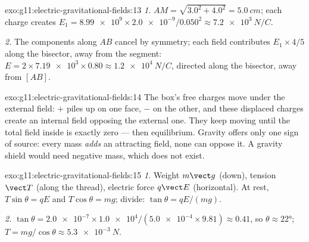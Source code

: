 \begin{solution}{exo:g11:electric-gravitational-fields:13}
\emph{1.} $AM = \sqrt{3.0^2 + 4.0^2} = \qty{5.0}{cm}$; each charge
creates $E_1 = \num{8.99e9} \times \num{2.0e-9} / 0.050^2
\approx \qty{7.2e3}{N/C}$.

\emph{2.} The components along $AB$ cancel by symmetry; each field
contributes $E_1 \times 4/5$ along the bisector, away from the segment:
$E = 2 \times \num{7.19e3} \times 0.80 \approx \qty{1.2e4}{N/C}$,
directed along the bisector, away from $[AB]$.
\end{solution}

\begin{solution}{exo:g11:electric-gravitational-fields:14}
The box's free charges move under the external field: $+$ piles up on
one face, $-$ on the other, and these displaced charges create an
internal field opposing the external one. They keep moving until the
total field inside is exactly zero --- then equilibrium. Gravity offers
only one sign of source: every mass \emph{adds} an attracting field,
none can oppose it. A gravity shield would need negative mass, which
does not exist.
\end{solution}

\begin{solution}{exo:g11:electric-gravitational-fields:15}
\emph{1.} Weight $m\vect g$ (down), tension $\vect T$ (along the
thread), electric force $q\vect E$ (horizontal). At rest,
$T\sin\theta = qE$ and $T\cos\theta = mg$; divide:
$\tan\theta = qE/(mg)$.

\emph{2.} $\tan\theta = \num{2.0e-7} \times \num{1.0e4} /
(\num{5.0e-4} \times 9.81) \approx 0.41$, so $\theta \approx \ang{22}$;
$T = mg/\cos\theta \approx \qty{5.3e-3}{N}$.
\end{solution}


